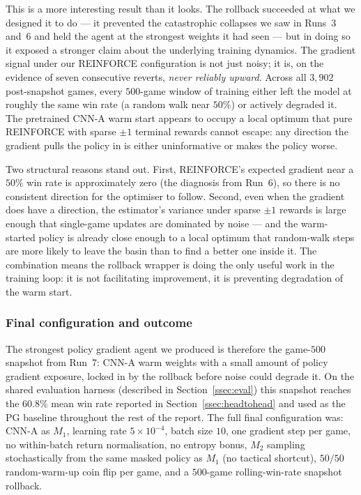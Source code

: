 \documentclass[11pt]{article}
\begin{document}
This is a more interesting result than it looks. The rollback
succeeded at what we designed it to do --- it prevented the
catastrophic collapses we saw in Runs~3 and~6 and held the agent at
the strongest weights it had seen --- but in doing so it exposed a
stronger claim about the underlying training dynamics. The gradient
signal under our REINFORCE configuration is not just noisy; it is, on
the evidence of seven consecutive reverts, \emph{never reliably
upward}. Across all $3{,}902$ post-snapshot games, every $500$-game
window of training either left the model at roughly the same win rate
(a random walk near $50\%$) or actively degraded it. The pretrained
CNN-A warm start appears to occupy a local optimum that pure
REINFORCE with sparse $\pm 1$ terminal rewards cannot escape: any
direction the gradient pulls the policy in is either uninformative or
makes the policy worse.

Two structural reasons stand out. First, REINFORCE's expected
gradient near a $50\%$ win rate is approximately zero (the diagnosis
from Run~6), so there is no consistent direction for the optimiser
to follow. Second, even when the gradient does have a direction, the
estimator's variance under sparse $\pm 1$ rewards is large enough
that single-game updates are dominated by noise --- and the
warm-started policy is already close enough to a local optimum that
random-walk steps are more likely to leave the basin than to find a
better one inside it. The combination means the rollback wrapper is
doing the only useful work in the training loop: it is not
facilitating improvement, it is preventing degradation of the warm
start.

\subsubsection{Final configuration and outcome}
\label{sssec:pg_final}

The strongest policy gradient agent we produced is therefore the
game-$500$ snapshot from Run~7: CNN-A warm weights with a small
amount of policy gradient exposure, locked in by the rollback before
noise could degrade it. On the shared evaluation harness (described
in Section~\ref{ssec:eval}) this snapshot reaches the $60.8\%$ mean
win rate reported in Section~\ref{ssec:headtohead} and used as the
PG baseline throughout the rest of the report. The full final
configuration was: CNN-A as $M_1$, learning rate $5 \times 10^{-4}$,
batch size $10$, one gradient step per game, no within-batch return
normalisation, no entropy bonus, $M_2$ sampling stochastically from
the same masked policy as $M_1$ (no tactical shortcut), $50/50$
random-warm-up coin flip per game, and a $500$-game rolling-win-rate
snapshot rollback.
\end{document}
